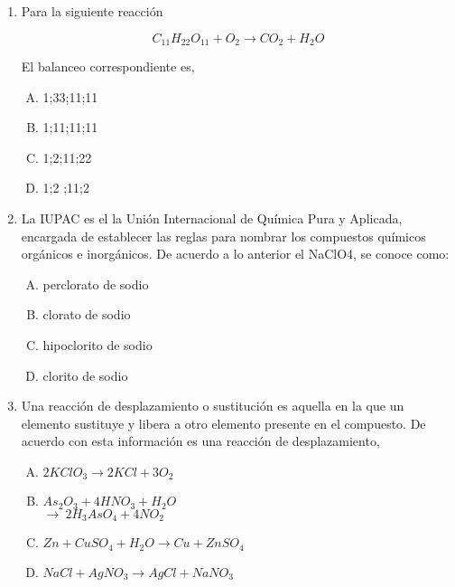 \begin{enumerate}


\item  Para la siguiente reacción  \label{jenn-13}

\begin{equation*}
C_{11}H_{22}O_{11}+O_{2}\longrightarrow CO_{2}+H_{2}O
\end{equation*}

El balanceo correspondiente es,
\begin{enumerate}[(A)]
\item   1;33;11;11
\item 1;11;11;11
\item 1;2;11;22
\item 1;2 ;11;2
\end{enumerate}




\item   La IUPAC es el la Unión Internacional de Química Pura y Aplicada, encargada de establecer las reglas para nombrar los compuestos químicos orgánicos e inorgánicos. De acuerdo a lo anterior el NaClO4, se conoce como:\label{jenn-14}


\begin{enumerate}[(A)]
\item   perclorato de sodio
\item clorato de sodio
\item hipoclorito de sodio
\item clorito de sodio
\end{enumerate}




\item Una reacción de desplazamiento o sustitución es aquella en la que un elemento sustituye y libera a otro elemento presente en el compuesto. De acuerdo con esta información es una reacción de desplazamiento,  \label{jenn-15}


\begin{enumerate}[(A)]
\item $2KClO_{3}\longrightarrow 2KCl + 3O_{2}$
\item $As_{2}O_{3}+4HNO_{3}+H_{2}O$\\ 
 $\longrightarrow\ 2H_{3}AsO_{4}+4NO_{2}$\hfill
\item $Zn + CuSO_{4}+H_{2}O\longrightarrow Cu + ZnSO_{4}$
\item $NaCl+AgNO_{3}\longrightarrow AgCl + NaNO_{3}$
\end{enumerate}



\end{enumerate}
